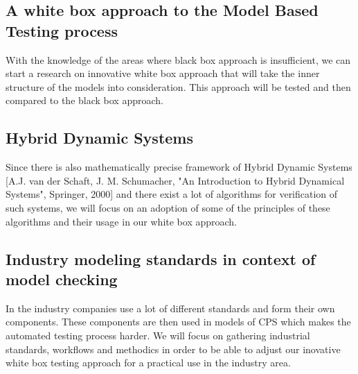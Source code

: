 \subsection{A white box approach to the Model Based Testing process}
With the knowledge of the areas where black box approach is insufficient, we can start a research on innovative white box approach that will take the inner structure of the models into consideration. This approach will be tested and then compared to the black box approach.

\subsection{Hybrid Dynamic Systems}
Since there is also mathematically precise framework of Hybrid Dynamic Systems [A.J. van der Schaft, J. M. Schumacher, "An Introduction to Hybrid Dynamical Systems", Springer, 2000] and there exist a lot of algorithms for verification of such systems, we will focus on an adoption of some of the principles of these algorithms and their usage in our white box approach.

\subsection{Industry modeling standards in context of model checking}
In the industry companies use a lot of different standards and form their own components. These components are then used in models of CPS which makes the automated testing process harder. We will focus on gathering industrial standards, workflows and methodics in order to be able to adjust our inovative white box testing approach for a practical use in the industry area.